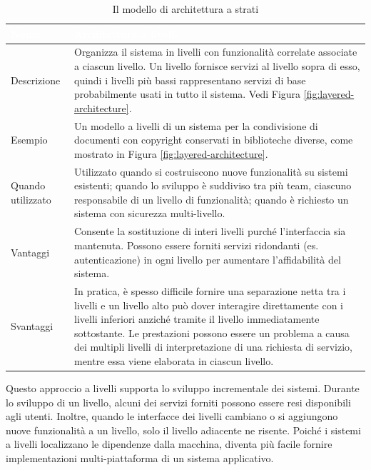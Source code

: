 \begin{table}[ht]
\centering
{}
\begin{tabular}{|p{3cm}|p{11.5cm}|}
\hline
\rowcolor{headerblue}
\textbf{\textcolor{white}{Nome}} & \textbf{\textcolor{white}{Architettura a livelli}} \\\hline
Descrizione & Organizza il sistema in livelli con funzionalità correlate associate a ciascun livello. Un livello fornisce servizi al livello sopra di esso, quindi i livelli più bassi rappresentano servizi di base probabilmente usati in tutto il sistema. Vedi Figura \ref{fig:layered-architecture}.\\\hline
Esempio & Un modello a livelli di un sistema per la condivisione di documenti con copyright conservati in biblioteche diverse, come mostrato in Figura \ref{fig:layered-architecture}.\\\hline
Quando utilizzato & Utilizzato quando si costruiscono nuove funzionalità su sistemi esistenti; quando lo sviluppo è suddiviso tra più team, ciascuno responsabile di un livello di funzionalità; quando è richiesto un sistema con sicurezza multi-livello.\\\hline
Vantaggi & Consente la sostituzione di interi livelli purché l'interfaccia sia mantenuta. Possono essere forniti servizi ridondanti (es. autenticazione) in ogni livello per aumentare l'affidabilità del sistema.\\\hline
Svantaggi & In pratica, è spesso difficile fornire una separazione netta tra i livelli e un livello alto può dover interagire direttamente con i livelli inferiori anziché tramite il livello immediatamente sottostante. Le prestazioni possono essere un problema a causa dei multipli livelli di interpretazione di una richiesta di servizio, mentre essa viene elaborata in ciascun livello.
\\\hline
\end{tabular}
\caption{Il modello di architettura a strati}
\label{tab:layer-pattern}
\end{table}

Questo approccio a livelli supporta lo sviluppo incrementale dei sistemi. Durante lo sviluppo di un livello, alcuni dei servizi forniti possono essere resi disponibili agli utenti. Inoltre, quando le interfacce dei livelli cambiano o si aggiungono nuove funzionalità a un livello, solo il livello adiacente ne risente. Poiché i sistemi a livelli localizzano le dipendenze dalla macchina, diventa più facile fornire implementazioni multi-piattaforma di un sistema applicativo.

